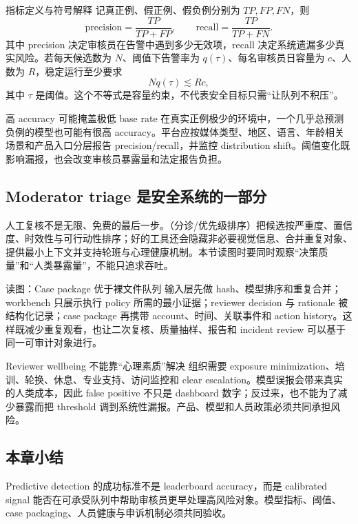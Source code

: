 
\begin{importantbox}{指标定义与符号解释}
记真正例、假正例、假负例分别为 $TP,FP,FN$，则
\[
\mathrm{precision}=\frac{TP}{TP+FP},\qquad
\mathrm{recall}=\frac{TP}{TP+FN}.
\]
其中 precision 决定审核员在告警中遇到多少无效项，recall 决定系统遗漏多少真实风险。若每天候选数为 $N$、阈值下告警率为 $q(\tau)$、每名审核员日容量为 $c$、人数为 $R$，稳定运行至少要求
\[
Nq(\tau) \lesssim Rc,
\]
其中 $\tau$ 是阈值。这个不等式是容量约束，不代表安全目标只需“让队列不积压”。
\end{importantbox}

\begin{warningbox}{高 accuracy 可能掩盖极低 base rate}
在真实正例极少的环境中，一个几乎总预测负例的模型也可能有很高 accuracy。平台应按媒体类型、地区、语言、年龄相关场景和产品入口分层报告 precision/recall，并监控 distribution shift。阈值变化既影响漏报，也会改变审核员暴露量和法定报告负担。
\end{warningbox}

\subsection{Moderator triage 是安全系统的一部分}

人工复核不是无限、免费的最后一步。（分诊/优先级排序）把候选按严重度、置信度、时效性与可行动性排序；好的工具还会隐藏非必要视觉信息、合并重复对象、提供最小上下文并支持轮班与心理健康机制。本节读图时要同时观察“决策质量”和“人类暴露量”，不能只追求吞吐。


\begin{knowledgebox}{读图：Case package 优于裸文件队列}
输入层先做 hash、模型排序和重复合并；workbench 只展示执行 policy 所需的最小证据；reviewer decision 与 rationale 被结构化记录；case package 再携带 account、时间、关联事件和 action history。这样既减少重复观看，也让二次复核、质量抽样、报告和 incident review 可以基于同一可审计对象进行。
\end{knowledgebox}

\begin{warningbox}{Reviewer wellbeing 不能靠“心理素质”解决}
组织需要 exposure minimization、培训、轮换、休息、专业支持、访问监控和 clear escalation。模型误报会带来真实的人类成本，因此 false positive 不只是 dashboard 数字；反过来，也不能为了减少暴露而把 threshold 调到系统性漏报。产品、模型和人员政策必须共同承担风险。
\end{warningbox}

\subsection{本章小结}

Predictive detection 的成功标准不是 leaderboard accuracy，而是 calibrated signal 能否在可承受队列中帮助审核员更早处理高风险对象。模型指标、阈值、case packaging、人员健康与申诉机制必须共同验收。

